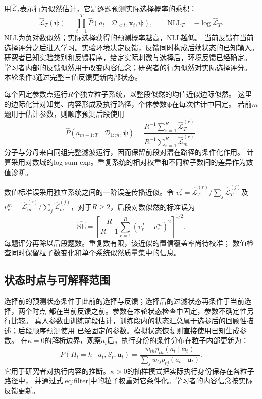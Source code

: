 \documentclass[11pt,a4paper]{article}
\numberwithin{equation}{section}
\begin{document}
用$\widehat{\mathcal L}_T$表示行为似然估计，它是逐题预测实际选择概率的乘积：
\begin{equation}
\widehat{\mathcal L}_T(\boldsymbol\psi)=\prod_{t=1}^T
\widehat P(a_t\mid\mathcal D_{<t},\bm x_t,\boldsymbol\psi),\qquad
\mathrm{NLL}_T=-\log\widehat{\mathcal L}_T.
\label{eq:behavior-likelihood}
\end{equation}
NLL为负对数似然；实际选择获得的预测概率越高，NLL越低。
当前反馈在当前选择评分之后进入学习。实验环境决定反馈，反馈同时构成后续状态的已知输入。
研究者已知实验类别和反馈程序，给定实际刺激与选择后，环境反馈已经确定。
学习者内部的反馈似然用于改变内容信念；研究者的行为似然对实际选择评分。
本轮条件3通过完整三值反馈更新内部状态。

每个固定参数点运行$R$个独立粒子系统，以整段似然的均值近似边际似然。
这里的边际化针对知觉、内容形成及执行路径，个体参数$\boldsymbol\psi$在每次估计中固定。
若前$m$题用于估计参数，则顺序预测后段使用
\begin{equation}
\widehat P(a_{m+1:T}\mid\mathcal D_{1:m},\boldsymbol\psi)
=\frac{R^{-1}\sum_{r=1}^R\widehat{\mathcal L}_T^{(r)}}{R^{-1}\sum_{r=1}^R\widehat{\mathcal L}_m^{(r)}}.
\label{eq:future-likelihood}
\end{equation}
分子与分母来自同组完整滤波运行，因而保留前段对潜在路径的条件化作用。
计算采用对数域的log-sum-exp。重复系统的相对权重和不同粒子数间的差异作为数值诊断。

数值标准误采用独立系统之间的一阶误差传播近似。令
$v_r^T=\widehat{\mathcal L}_T^{(r)}/\sum_j\widehat{\mathcal L}_T^{(j)}$及
$v_r^m=\widehat{\mathcal L}_m^{(r)}/\sum_j\widehat{\mathcal L}_m^{(j)}$，对于$R\geq2$，后段对数似然的标准误为
\begin{equation}
\widehat{\mathrm{SE}}=\left[\frac{R}{R-1}\sum_{r=1}^R(v_r^T-v_r^m)^2\right]^{1/2}.
\label{eq:mc-error}
\end{equation}
每题评分再除以后段题数。重复数有限，该近似的置信覆盖率尚待校准；
数值检查同时保留粒子数变化和单个系统似然质量集中的信息。

\subsection{状态时点与可解释范围}
选择前的预测状态条件于此前的选择与反馈；选择后的过滤状态再条件于当前选择，两个时点
都在当前反馈之前。参数在本轮状态检查中固定，参数不确定性另行比较。
真人参数由训练前段估计，训练段内的状态汇总属于选参后的回顾性描述；后段顺序预测使用
已经固定的参数。模拟状态恢复则直接使用已知生成参数。
在$\kappa=0$的解析边界，观察$a_t$后，执行身份的条件分布在粒子内部更新为：
\begin{equation}
P(H_t=h\mid a_t,S_t,\bm u_t)
=\frac{w_{th}p_{th}(a_t\mid\bm u_t)}{\sum_jw_{tj}p_{tj}(a_t\mid\bm u_t)}.
\label{eq:execution-filter}
\end{equation}
它用于研究者对执行内容的推断。$\kappa>0$的抽样模式把实际执行身份保存在各粒子路径中，
并通过式\eqref{eq:filter}中的粒子权重对它条件化。学习者的内容信念按实际反馈更新。
\end{document}
